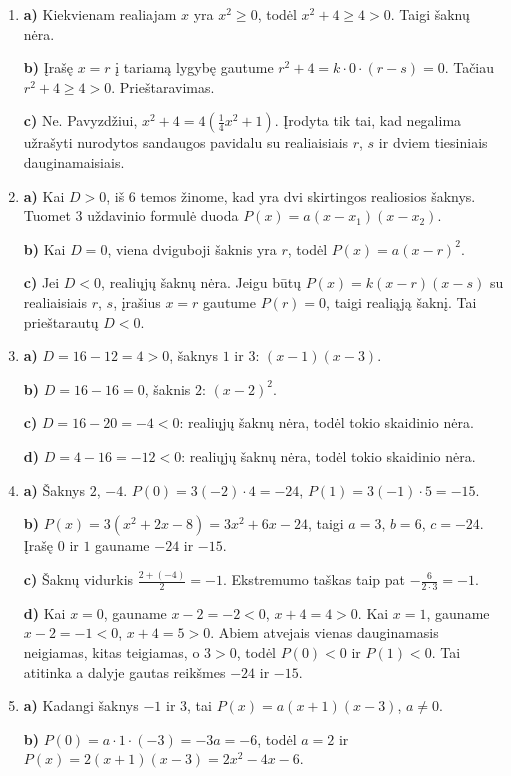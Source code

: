 \documentclass[12pt,a4paper]{article}
\begin{document}
\begin{enumerate}
\textbf{d)} Teisinga: atskliaudę gauname $-2\left(x^2-\frac{5}{2}x-\frac{3}{2}\right)=-2x^2+5x+3$.
\item \textbf{a)} Kiekvienam realiajam $x$ yra $x^2\geq0$, todėl $x^2+4\geq4>0$. Taigi šaknų nėra.

\textbf{b)} Įrašę $x=r$ į tariamą lygybę gautume $r^2+4=k\cdot0\cdot(r-s)=0$. Tačiau $r^2+4\geq4>0$. Prieštaravimas.

\textbf{c)} Ne. Pavyzdžiui, $x^2+4=4\left(\frac{1}{4}x^2+1\right)$. Įrodyta tik tai, kad negalima užrašyti nurodytos sandaugos pavidalu su realiaisiais $r$, $s$ ir dviem tiesiniais dauginamaisiais.
\item \textbf{a)} Kai $D>0$, iš 6 temos žinome, kad yra dvi skirtingos realiosios šaknys. Tuomet 3 uždavinio formulė duoda $P(x)=a(x-x_1)(x-x_2)$.

\textbf{b)} Kai $D=0$, viena dviguboji šaknis yra $r$, todėl $P(x)=a(x-r)^2$.

\textbf{c)} Jei $D<0$, realiųjų šaknų nėra. Jeigu būtų $P(x)=k(x-r)(x-s)$ su realiaisiais $r$, $s$, įrašius $x=r$ gautume $P(r)=0$, taigi realiąją šaknį. Tai prieštarautų $D<0$.
\item \textbf{a)} $D=16-12=4>0$, šaknys $1$ ir $3$: $(x-1)(x-3)$.

\textbf{b)} $D=16-16=0$, šaknis $2$: $(x-2)^2$.

\textbf{c)} $D=16-20=-4<0$: realiųjų šaknų nėra, todėl tokio skaidinio nėra.

\textbf{d)} $D=4-16=-12<0$: realiųjų šaknų nėra, todėl tokio skaidinio nėra.
\item \textbf{a)} Šaknys $2$, $-4$. $P(0)=3(-2)\cdot4=-24$, $P(1)=3(-1)\cdot5=-15$.

\textbf{b)} $P(x)=3(x^2+2x-8)=3x^2+6x-24$, taigi $a=3$, $b=6$, $c=-24$. Įrašę $0$ ir $1$ gauname $-24$ ir $-15$.

\textbf{c)} Šaknų vidurkis $\frac{2+(-4)}{2}=-1$. Ekstremumo taškas taip pat $-\frac{6}{2\cdot3}=-1$.

\textbf{d)} Kai $x=0$, gauname $x-2=-2<0$, $x+4=4>0$. Kai $x=1$, gauname $x-2=-1<0$, $x+4=5>0$. Abiem atvejais vienas dauginamasis neigiamas, kitas teigiamas, o $3>0$, todėl $P(0)<0$ ir $P(1)<0$. Tai atitinka a dalyje gautas reikšmes $-24$ ir $-15$.
\item \textbf{a)} Kadangi šaknys $-1$ ir $3$, tai $P(x)=a(x+1)(x-3)$, $a\ne0$.

\textbf{b)} $P(0)=a\cdot1\cdot(-3)=-3a=-6$, todėl $a=2$ ir $P(x)=2(x+1)(x-3)=2x^2-4x-6$.


\end{enumerate}
\end{document}
